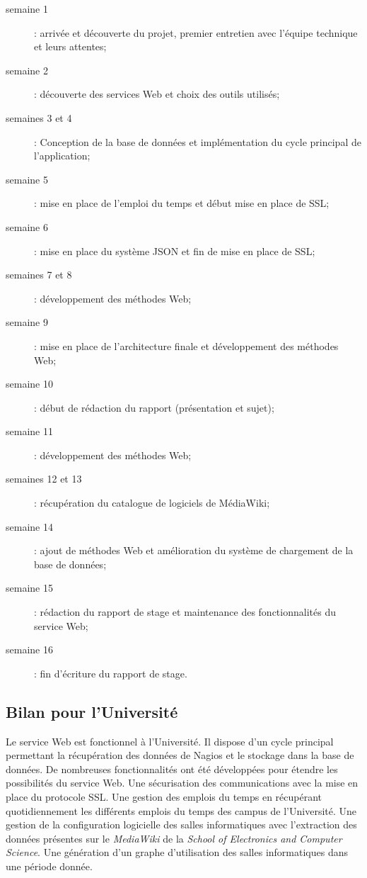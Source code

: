 \begin{description}
	\item[semaine 1] : arriv\'ee et d\'ecouverte du projet, premier entretien avec l'\'equipe technique et leurs attentes;
	\item[semaine 2] : d\'ecouverte des services Web et choix des outils utilis\'es;
	\item[semaines 3 et 4] : Conception de la base de donn\'ees et impl\'ementation du cycle principal de l'application;
	\item[semaine 5] : mise en place de l'emploi du temps et d\'ebut mise en place de SSL;
	\item[semaine 6] : mise en place du syst\`eme JSON et fin de mise en place de SSL;
	\item[semaines 7 et 8] : d\'eveloppement des m\'ethodes Web;
	\item[semaine 9] : mise en place de l'architecture finale et d\'eveloppement des m\'ethodes Web;
	\item[semaine 10] : d\'ebut de r\'edaction du rapport (pr\'esentation et sujet);
	\item[semaine 11] : d\'eveloppement des m\'ethodes Web;
	\item[semaines 12 et 13] : r\'ecup\'eration du catalogue de logiciels de M\'ediaWiki;
	\item[semaine 14] : ajout de m\'ethodes Web et am\'elioration du syst\`eme de chargement de la base de donn\'ees;
	\item[semaine 15] : r\'edaction du rapport de stage et maintenance des fonctionnalit\'es du service Web;
	\item[semaine 16] : fin d'\'ecriture du rapport de stage.

\end{description}

\subsection{Bilan pour l'Universit\'e}

Le service Web est fonctionnel \`a l'Universit\'e.
Il dispose d'un cycle principal permettant la r\'ecup\'eration des donn\'ees de Nagios et le stockage dans la base de donn\'ees.
De nombreuses fonctionnalit\'es ont \'et\'e d\'evelopp\'ees pour \'etendre les possibilit\'es du service Web.
Une s\'ecurisation des communications avec la mise en place du protocole SSL.
Une gestion des emplois du temps en r\'ecup\'erant quotidiennement les diff\'erents emplois du temps des campus de l'Universit\'e.
Une gestion de la configuration logicielle des salles informatiques avec l'extraction des donn\'ees pr\'esentes sur le \textit{MediaWiki} de la \textit{School of Electronics and Computer Science}.
Une g\'en\'eration d'un graphe d'utilisation des salles informatiques dans une p\'eriode donn\'ee.

